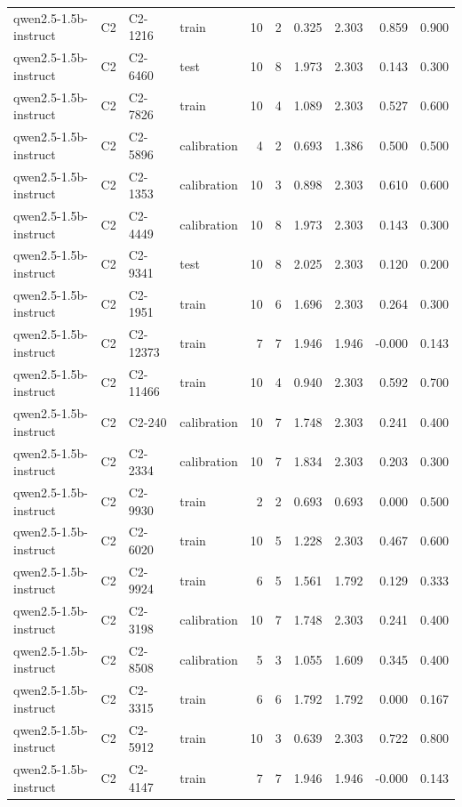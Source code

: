 \begin{table}
\begin{tabular}{llllrrrrrr}
qwen2.5-1.5b-instruct & C2 & C2-1216 & train & 10 & 2 & 0.325 & 2.303 & 0.859 & 0.900 \\
qwen2.5-1.5b-instruct & C2 & C2-6460 & test & 10 & 8 & 1.973 & 2.303 & 0.143 & 0.300 \\
qwen2.5-1.5b-instruct & C2 & C2-7826 & train & 10 & 4 & 1.089 & 2.303 & 0.527 & 0.600 \\
qwen2.5-1.5b-instruct & C2 & C2-5896 & calibration & 4 & 2 & 0.693 & 1.386 & 0.500 & 0.500 \\
qwen2.5-1.5b-instruct & C2 & C2-1353 & calibration & 10 & 3 & 0.898 & 2.303 & 0.610 & 0.600 \\
qwen2.5-1.5b-instruct & C2 & C2-4449 & calibration & 10 & 8 & 1.973 & 2.303 & 0.143 & 0.300 \\
qwen2.5-1.5b-instruct & C2 & C2-9341 & test & 10 & 8 & 2.025 & 2.303 & 0.120 & 0.200 \\
qwen2.5-1.5b-instruct & C2 & C2-1951 & train & 10 & 6 & 1.696 & 2.303 & 0.264 & 0.300 \\
qwen2.5-1.5b-instruct & C2 & C2-12373 & train & 7 & 7 & 1.946 & 1.946 & -0.000 & 0.143 \\
qwen2.5-1.5b-instruct & C2 & C2-11466 & train & 10 & 4 & 0.940 & 2.303 & 0.592 & 0.700 \\
qwen2.5-1.5b-instruct & C2 & C2-240 & calibration & 10 & 7 & 1.748 & 2.303 & 0.241 & 0.400 \\
qwen2.5-1.5b-instruct & C2 & C2-2334 & calibration & 10 & 7 & 1.834 & 2.303 & 0.203 & 0.300 \\
qwen2.5-1.5b-instruct & C2 & C2-9930 & train & 2 & 2 & 0.693 & 0.693 & 0.000 & 0.500 \\
qwen2.5-1.5b-instruct & C2 & C2-6020 & train & 10 & 5 & 1.228 & 2.303 & 0.467 & 0.600 \\
qwen2.5-1.5b-instruct & C2 & C2-9924 & train & 6 & 5 & 1.561 & 1.792 & 0.129 & 0.333 \\
qwen2.5-1.5b-instruct & C2 & C2-3198 & calibration & 10 & 7 & 1.748 & 2.303 & 0.241 & 0.400 \\
qwen2.5-1.5b-instruct & C2 & C2-8508 & calibration & 5 & 3 & 1.055 & 1.609 & 0.345 & 0.400 \\
qwen2.5-1.5b-instruct & C2 & C2-3315 & train & 6 & 6 & 1.792 & 1.792 & 0.000 & 0.167 \\
qwen2.5-1.5b-instruct & C2 & C2-5912 & train & 10 & 3 & 0.639 & 2.303 & 0.722 & 0.800 \\
qwen2.5-1.5b-instruct & C2 & C2-4147 & train & 7 & 7 & 1.946 & 1.946 & -0.000 & 0.143 \\

\end{tabular}
\end{table}
